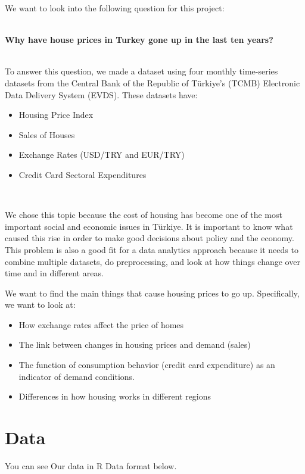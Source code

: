 \documentclass[
  11pt,
  a4paper,
]{article}
\begin{document}
We want to look into the following question for this project:\\
\strut \\
\textbf{Why have house prices in Turkey gone up in the last ten
years?}\\
\strut \\
To answer this question, we made a dataset using four monthly
time-series datasets from the Central Bank of the Republic of Türkiye's
(TCMB) Electronic Data Delivery System (EVDS). These datasets have:\\

\begin{itemize}
\item
  Housing Price Index
\item
  Sales of Houses
\item
  Exchange Rates (USD/TRY and EUR/TRY)
\item
  Credit Card Sectoral Expenditures\\
  \strut \\
\end{itemize}

We chose this topic because the cost of housing has become one of the
most important social and economic issues in Türkiye. It is important to
know what caused this rise in order to make good decisions about policy
and the economy. This problem is also a good fit for a data analytics
approach because it needs to combine multiple datasets, do
preprocessing, and look at how things change over time and in different
areas.

We want to find the main things that cause housing prices to go up.
Specifically, we want to look at:

\begin{itemize}
\item
  How exchange rates affect the price of homes
\item
  The link between changes in housing prices and demand (sales)
\item
  The function of consumption behavior (credit card expenditure) as an
  indicator of demand conditions.
\item
  Differences in how housing works in different regions
\end{itemize}

\section{Data}\label{data}

You can see Our data in R Data format below.
\end{document}
